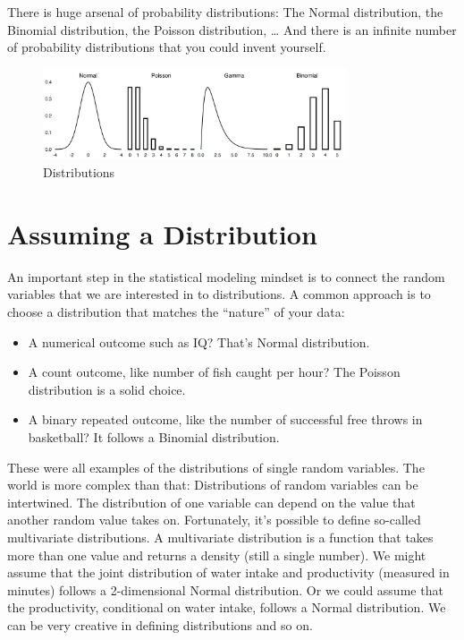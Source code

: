 \documentclass[
  10pt,
]{scrbook}
\providecommand{\tightlist}{%
  \setlength{\itemsep}{0pt}\setlength{\parskip}{0pt}}
\begin{document}
There is huge arsenal of probability distributions: The Normal distribution, the Binomial distribution, the Poisson distribution, \ldots{}
And there is an infinite number of probability distributions that you could invent yourself.

\begin{figure}

{\centering \includegraphics[width=0.8\textwidth]{figures/distributions-1} 

}

\caption{Distributions}\label{fig:distributions}
\end{figure}

\hypertarget{assuming-a-distribution}{%
\section{Assuming a Distribution}\label{assuming-a-distribution}}

An important step in the statistical modeling mindset is to connect the random variables that we are interested in to distributions.
A common approach is to choose a distribution that matches the ``nature'' of your data:

\begin{itemize}
\tightlist
\item
  A numerical outcome such as IQ? That's Normal distribution.
\item
  A count outcome, like number of fish caught per hour? The Poisson distribution is a solid choice.
\item
  A binary repeated outcome, like the number of successful free throws in basketball? It follows a Binomial distribution.
\end{itemize}

These were all examples of the distributions of single random variables.
The world is more complex than that:
Distributions of random variables can be intertwined.
The distribution of one variable can depend on the value that another random value takes on.
Fortunately, it's possible to define so-called multivariate distributions.
A multivariate distribution is a function that takes more than one value and returns a density (still a single number).
We might assume that the joint distribution of water intake and productivity (measured in minutes) follows a 2-dimensional Normal distribution.
Or we could assume that the productivity, conditional on water intake, follows a Normal distribution.
We can be very creative in defining distributions and so on.
\end{document}
